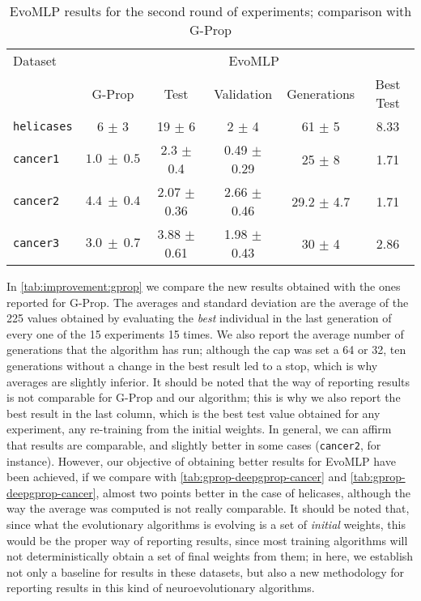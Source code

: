 \documentclass[conference]{IEEEtran}\usepackage[]{graphicx}\usepackage[]{color}
\begin{document}
\begin{table*}[h!tbp]
  \centering
  \caption{{\sf EvoMLP} results for the second round of experiments;
    comparison with G-Prop}
  \label{tab:improvement:gprop}
  \begin{tabular}{|l|c|c|c|c|c|}
    \hline
    Dataset &        & \multicolumn{3}{|c|}{EvoMLP} & \\
            & G-Prop & Test & Validation & Generations & Best Test\\ \hline
    {\tt helicases} & 6 $\pm$ 3 & 19 $\pm$ 6 & 2 $\pm$ 4 & 61 $\pm$ 5 & 8.33 \\ \hline
    {\tt cancer1} & $1.0\ \pm\ 0.5$  & 2.3 $\pm$ 0.4 & 0.49 $\pm$ 0.29 & 25 $\pm$ 8 & 1.71 \\ \hline
    {\tt cancer2} & $4.4\ \pm\ 0.4$  & 2.07 $\pm$ 0.36 & 2.66 $\pm$ 0.46 & 29.2 $\pm$ 4.7 & 1.71 \\ \hline
    {\tt cancer3} & $3.0\ \pm\ 0.7$  & 3.88 $\pm$ 0.61 & 1.98 $\pm$ 0.43 & 30 $\pm$ 4 & 2.86 \\ \hline
  \end{tabular}
\end{table*}
%
In \autoref{tab:improvement:gprop} we compare the new results obtained with the ones reported for G-Prop. The averages and standard deviation are the average of the 225 values obtained by evaluating the {\em best} individual in the last generation of every one of the 15 experiments 15 times. We also report the average number of generations that the algorithm has run; although the cap was set a 64 or 32, ten generations without a change in the best result led to a stop, which is why averages are slightly inferior. It should be noted that the way of reporting results is not comparable for G-Prop and our algorithm; this is why we also report the best result in the last column, which is the best test value obtained for any experiment, any re-training from the initial weights. In general, we can affirm that results are comparable, and slightly better in some cases ({\tt cancer2}, for instance). However, our objective of obtaining better results for EvoMLP have been achieved, if we compare with \autoref{tab:gprop-deepgprop-cancer} and \autoref{tab:gprop-deepgprop-cancer}, almost two points better in the case of helicases, although the way the average was computed is not really comparable. It should be noted that, since what the evolutionary algorithms is evolving is a set of {\em initial} weights, this would be the proper way of reporting results, since most training algorithms will not deterministically obtain a set of final weights from them; in here, we establish not only a baseline for results in these datasets, but also a new methodology for reporting results in this kind of neuroevolutionary algorithms.
\end{document}
